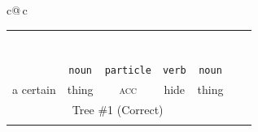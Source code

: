 \documentclass[a4paper,landscape,headrule,footrule,xetex]{foils}
\newcommand{\sa}[2]{\rnode{c#1}{\iz{#2}}}%
\begin{document}

{\tiny
 \hspace*{-15mm}\begin{tabular}{c@{\,}c} 

  \addtolength{\tabcolsep}{-0.3em}
  \begin{tabular}{ccccccc}
   &\multicolumn{5}{c}{\sa{1}{NP-frag}}  \\[1ex]
   &\multicolumn{5}{c}{\sa{2}{\wl{rel-cl-sbj-gap}}}  \\[1ex]
   &\multicolumn{3}{c}{\sa{3}{hd-complement}} & \sa{4}{N} \\[1ex]
   \multicolumn{3}{c}{\sa{5}{hd-complement}} & \multicolumn{1}{c}{\sa{J}{V}} &
   \\[1ex]
   \multicolumn{2}{c}{\sa{I}{\ul{hd-specifier}}} & & &  & \\[1ex]
   \sa{H}{DET} & \sa{7}{N}      & \sa{8}{CASE-P} &   &  \\[1ex]
   \sa{G}{ある} & \sa{B}{物事} & \sa{C}{を} & \sa{D}{隠す} &  \sa{F}{ 物} \\
   \texttt{\emp{\ul{adnominal}}} & \texttt{noun} & \texttt{particle} & \texttt{verb} & \texttt{noun} \\
   a certain & thing &  \textsc{acc} & hide &  thing \\
   \multicolumn{5}{c}{Tree \#1 (Correct)} \\ \\
  \end{tabular}
  \centering
   
   
   
    
   
   
  

\end{tabular}}
\end{document}
